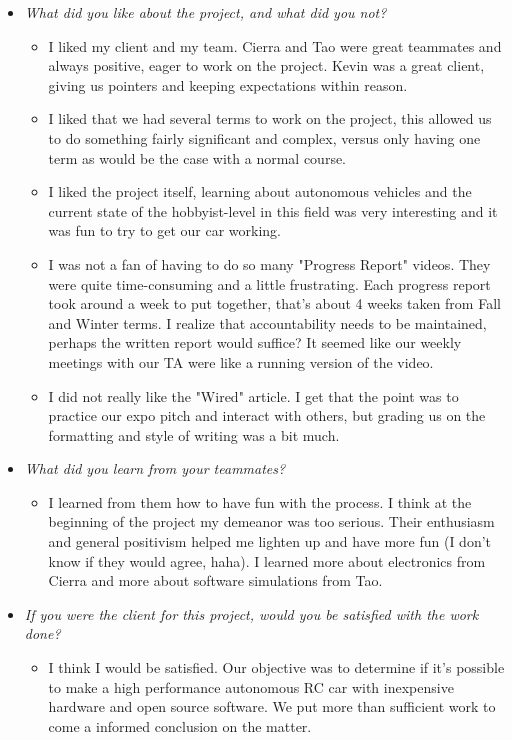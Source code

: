 \documentclass{article}
\begin{document}
\begin{itemize}
    \item \textit{What did you like about the project, and what did you not?}
    \begin{itemize}
        \item I liked my client and my team. Cierra and Tao were great teammates and always positive, eager to work on the project. Kevin was a great client, giving us pointers and keeping expectations within reason.
        \item I liked that we had several terms to work on the project, this allowed us to do something fairly significant and complex, versus only having one term as would be the case with a normal course.
        \item I liked the project itself, learning about autonomous vehicles and the current state of the hobbyist-level in this field was very interesting and it was fun to try to get our car working.
        \item I was not a fan of having to do so many "Progress Report" videos. They were quite time-consuming and a little frustrating. Each progress report took around a week to put together, that's about 4 weeks taken from Fall and Winter terms. I realize that accountability needs to be maintained, perhaps the written report would suffice? It seemed like our weekly meetings with our TA were like a running version of the video.
        \item I did not really like the "Wired" article. I get that the point was to practice our expo pitch and interact with others, but grading us on the formatting and style of writing was a bit much.
    \end{itemize}

    \item \textit{What did you learn from your teammates?}
    \begin{itemize}
        \item I learned from them how to have fun with the process. I think at the beginning of the project my demeanor was too serious. Their enthusiasm and general positivism helped me lighten up and have more fun (I don't know if they would agree, haha). I learned more about electronics from Cierra and more about software simulations from Tao.
    \end{itemize}

    \item \textit{If you were the client for this project, would you be satisfied with the work done?}
    \begin{itemize}
        \item I think I would be satisfied. Our objective was to determine if it's possible to make a high performance autonomous RC car with inexpensive hardware and open source software. We put more than sufficient work to come a informed conclusion on the matter.
    \end{itemize}


\end{itemize}
\end{document}

